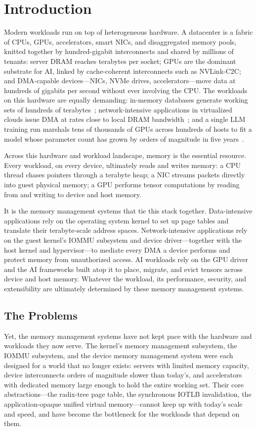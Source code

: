 \section{Introduction}
\label{chp:intro}

Modern workloads run on top of heterogeneous hardware.
A datacenter is a fabric of CPUs, GPUs, accelerators, smart NICs, and
disaggregated memory pools, knitted together by hundred-gigabit interconnects
and shared by millions of tenants:
server DRAM reaches terabytes per socket;
GPUs are the dominant substrate for AI, linked by cache-coherent interconnects
such as NVLink-C2C\@;
and DMA-capable devices---NICs, NVMe drives, accelerators---move data at
hundreds of gigabits per second without ever involving the CPU\@.
The workloads on this hardware are equally demanding:
in-memory databases generate working sets of hundreds of terabytes~\cite{redis};
network-intensive applications in virtualized clouds issue DMA at rates close
to local DRAM bandwidth~\cite{connectx7};
and a single LLM training run marshals tens of thousands of GPUs across hundreds
of hosts to fit a model whose parameter count has grown by orders of magnitude in
five years~\cite{llama3}.

Across this hardware and workload landscape, memory is the essential resource.
Every workload, on every device, ultimately reads and writes memory:
a CPU thread chases pointers through a terabyte heap;
a NIC streams packets directly into guest physical memory;
a GPU performs tensor computations by reading from and writing to device and host memory.

It is the memory management systems that tie this stack together.
Data-intensive applications rely on the operating system kernel to set up page
tables and translate their terabyte-scale address spaces.
Network-intensive applications rely on the guest kernel's IOMMU subsystem and device
driver---together with the host kernel and hypervisor---to mediate every DMA a device
performs and protect memory from unauthorized access.
AI workloads rely on the GPU driver and the AI frameworks built atop it to place,
migrate, and evict tensors across device and host memory.
Whatever the workload, its performance, security, and extensibility are
ultimately determined by these memory management systems.

\subsection{The Problems}
Yet, the memory management systems have not kept pace with the hardware and
workloads they now serve.
The kernel's memory management subsystem, the IOMMU subsystem, and the
device memory management system were each designed for a world that no longer exists:
servers with limited memory capacity,
device interconnects orders of magnitude slower than today's,
and accelerators with dedicated memory large enough to hold the entire working set.
Their core abstractions---the radix-tree page table, the synchronous IOTLB invalidation,
the application-opaque unified virtual memory---cannot keep up with today's scale and speed,
and have become the bottleneck for the workloads that depend on them.

